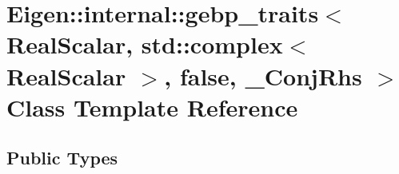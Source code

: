 \hypertarget{class_eigen_1_1internal_1_1gebp__traits_3_01_real_scalar_00_01std_1_1complex_3_01_real_scalar_01f99740ceef5f07e0f3738974eb65d89c}{}\section{Eigen\+::internal\+::gebp\+\_\+traits$<$ Real\+Scalar, std\+::complex$<$ Real\+Scalar $>$, false, \+\_\+\+Conj\+Rhs $>$ Class Template Reference}
\label{class_eigen_1_1internal_1_1gebp__traits_3_01_real_scalar_00_01std_1_1complex_3_01_real_scalar_01f99740ceef5f07e0f3738974eb65d89c}
\subsection*{Public Types}
